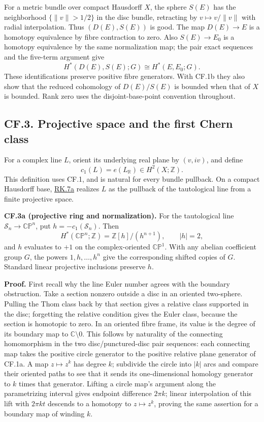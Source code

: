 \documentclass[
  11pt,
]{article}
\begin{document}
For a metric bundle over compact Hausdorff \(X\), the sphere \(S(E)\)
has the neighborhood \(\{\|v\|>1/2\}\) in the disc bundle, retracting by
\(v\mapsto v/\|v\|\) with radial interpolation. Thus \((D(E),S(E))\) is
good. The map \(D(E)\to E\) is a homotopy equivalence by fibre
contraction to zero. Also \(S(E)\to E_0\) is a homotopy equivalence by
the same normalization map; the pair exact sequences and the five-term
argument give \[
H^*(D(E),S(E);G)\cong H^*(E,E_0;G).
\tag{CF.8}
\] These identifications preserve positive fibre generators. With CF.1b
they also show that the reduced cohomology of \(D(E)/S(E)\) is bounded
when that of \(X\) is bounded. Rank zero uses the disjoint-base-point
convention throughout.

\subsection{CF.3. Projective space and the first Chern
class}\label{cf.3.-projective-space-and-the-first-chern-class}

For a complex line \(L\), orient its underlying real plane by
\((v,iv)\), and define \[
c_1(L)=e(L_{\mathbb R})\in H^2(X;\mathbb Z).
\tag{CF.9}
\] This definition uses CF.1, and is natural for every bundle pullback.
On a compact Hausdorff base,
\href{../relative-k-foundations/relative-k-foundations.html\#rk-line-classification}{RK.7a}
realizes \(L\) as the pullback of the tautological line from a finite
projective space.

\textbf{CF.3a (projective ring and normalization).} For the tautological
line \(\mathcal S_n\to\mathbb{CP}^n\), put \(h=-c_1(\mathcal S_n)\).
Then \[
H^*(\mathbb{CP}^n;\mathbb Z)=\mathbb Z[h]/(h^{n+1}),\qquad |h|=2,
\tag{CF.10}
\] and \(h\) evaluates to \(+1\) on the complex-oriented
\(\mathbb{CP}^1\). With any abelian coefficient group \(G\), the powers
\(1,h,\ldots,h^n\) give the corresponding shifted copies of \(G\).
Standard linear projective inclusions preserve \(h\).

\textbf{Proof.} First recall why the line Euler number agrees with the
boundary obstruction. Take a section nonzero outside a disc in an
oriented two-sphere. Pulling the Thom class back by that section gives a
relative class supported in the disc; forgetting the relative condition
gives the Euler class, because the section is homotopic to zero. In an
oriented fibre frame, its value is the degree of its boundary map to
\(\mathbb C\setminus0\). This follows by naturality of the connecting
homomorphism in the two disc/punctured-disc pair sequences: each
connecting map takes the positive circle generator to the positive
relative plane generator of CF.1a. A map \(z\mapsto z^k\) has degree
\(k\); subdivide the circle into \(|k|\) arcs and compare their oriented
paths to see that it sends its one-dimensional homology generator to
\(k\) times that generator. Lifting a circle map's argument along the
parametrizing interval gives endpoint difference \(2\pi k\); linear
interpolation of this lift with \(2\pi kt\) descends to a homotopy to
\(z\mapsto z^k\), proving the same assertion for a boundary map of
winding \(k\).
\end{document}
